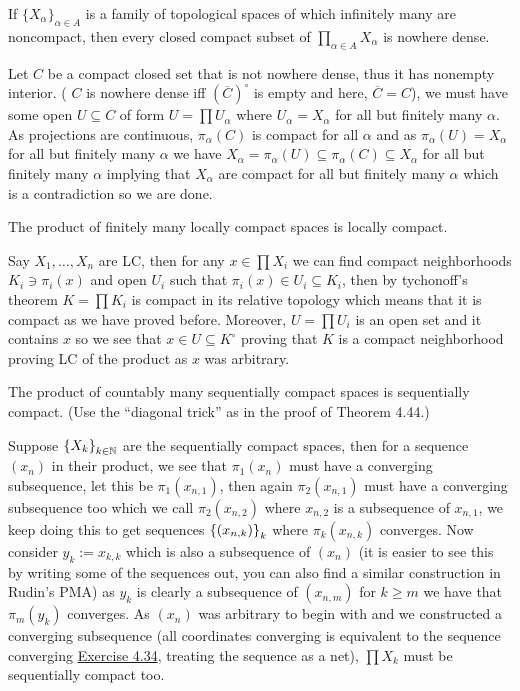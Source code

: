 \documentclass[12pt,a4paper]{article}
\begin{document}
\begin{problem}\label{prob:4-58}
If $\{X_\alpha\}_{\alpha \in A}$ is a family of topological spaces of which infinitely many are noncompact, then every closed compact subset of $\prod_{\alpha \in A} X_\alpha$ is nowhere dense.
\end{problem}
\begin{solution}
    Let $C$ be a compact closed set that is not nowhere dense, thus it has nonempty interior. ( $C$ is nowhere dense iff $(\overline{C})^\circ$ is empty and here, $\overline{C}=C$), we must have some open $U \subseteq C$ of form $U=\prod U_\alpha$ where $U_\alpha=X_\alpha$ for all but finitely many $\alpha.$ 
    As projections are continuous, $\pi_\alpha(C)$ is compact for all $\alpha$ and as $\pi_\alpha(U)=X_\alpha$ for all but finitely many $\alpha$ we have $X_\alpha=\pi_\alpha(U) \subseteq\pi_\alpha(C) \subseteq X_\alpha$ for all but finitely many $\alpha$ implying that $X_\alpha$ are compact for all but finitely many $\alpha$ which is a contradiction so we are done. 
\end{solution}
\begin{problem}\label{prob:4-59}
The product of finitely many locally compact spaces is locally compact.
\end{problem}
\begin{solution}
Say $X_1,\ldots,X_n$ are LC, then for any $x\in\prod X_i$ we can find compact neighborhoods $K_i\ni\pi_i(x)$ and open $U_i$ such that $\pi_i(x)\in U_i \subseteq K_i$, then by tychonoff's theorem $K=\prod K_i$ is compact in its relative topology which means that it is compact as we have proved before. 
Moreover, $U=\prod U_i$ is an open set and it contains $x$ so we see that $x\in U \subseteq K^\circ$ proving that $K$ is a compact neighborhood proving LC of the product as $x$ was arbitrary. 
\end{solution}
\begin{problem}\label{prob:4-60}
The product of countably many sequentially compact spaces is sequentially compact. (Use the ``diagonal trick'' as in the proof of Theorem 4.44.)
\end{problem}
\begin{solution}
    Suppose $ \qty{X_k}_{k\in\mathbb{N}}$ are the sequentially compact spaces, then for a sequence $(x_n)$ in their product, we see that $\pi_1(x_n)$ must have a converging subsequence, let this be $\pi_1({x_{n,1}})$, then again $\pi_2(x_{n,1})$ must have a converging subsequence too which we call $\pi_2(x_{n,2})$ where $x_{n,2}$ is a subsequence of $x_{n,1}$, we keep doing this to get sequences $ \qty{ (x_{n,k})}_{k}$ where $\pi_k(x_{n,k})$ converges. 
    Now consider $y_k:=x_{k,k}$ which is also a subsequence of $(x_n)$ (it is easier to see this by writing some of the sequences out, you can also find a similar construction in Rudin's PMA) as $y_k$ is clearly a subsequence of $(x_{n,m})$ for $k\geq m$ we have that $\pi_m(y_k)$ converges. 
    As $(x_n)$ was arbitrary to begin with and we constructed a converging subsequence (all coordinates converging is equivalent to the sequence converging \hyperref[prob:4-34]{Exercise 4.34}, treating the sequence as a net), $\prod X_k$ must be sequentially compact too.  
\end{solution}
\end{document}
